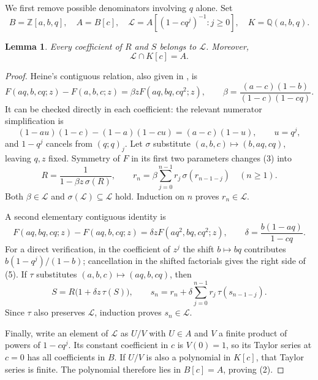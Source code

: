 \documentclass[10pt]{article}
\newtheorem{lemma}[theorem]{Lemma}
\newcommand{\Z}{\mathbb Z}
\newcommand{\Q}{\mathbb Q}
\begin{document}
We first remove possible denominators involving $q$ alone. Set
\[
 B=\Z[a,b,q],\quad A=B[c],\quad
 \mathcal L=A[(1-cq^j)^{-1}:j\ge0],\quad K=\Q(a,b,q).
\]
\begin{lemma}\label{integral}
Every coefficient of $R$ and $S$ belongs to $\mathcal L$.
Moreover,
\[
 \mathcal L\cap K[c]=A.                                  \tag{2}
\]
\end{lemma}
\begin{proof}
Heine's contiguous relation, also given in \cite[p.~13]{KS}, is
\[
 F(aq,b,cq;z)-F(a,b,c;z)
   =\beta z F(aq,bq,cq^2;z),\qquad
 \beta=\frac{(a-c)(1-b)}{(1-c)(1-cq)}.                    \tag{3}
\]
It can be checked directly in each coefficient: the relevant numerator
simplification is
\[
 (1-au)(1-c)-(1-a)(1-cu)=(a-c)(1-u),\qquad u=q^j,
\]
and $1-q^j$ cancels from $(q;q)_j$.
Let $\sigma$ substitute $(a,b,c)\mapsto(b,aq,cq)$, leaving $q,z$
fixed. Symmetry of $F$ in its first two parameters changes (3) into
\[
 R=\frac1{1-\beta z\,\sigma(R)},\qquad
 r_n=\beta\sum_{j=0}^{n-1}r_j\,\sigma(r_{n-1-j})\quad(n\ge1).
                                                               \tag{4}
\]
Both $\beta\in\mathcal L$ and
$\sigma(\mathcal L)\subseteq\mathcal L$ hold.
Induction on $n$ proves $r_n\in\mathcal L$.

A second elementary contiguous identity is
\[
 F(aq,bq,cq;z)-F(aq,b,cq;z)
   =\delta z F(aq^2,bq,cq^2;z),\qquad
 \delta=\frac{b(1-aq)}{1-cq}.                             \tag{5}
\]
For a direct verification, in the coefficient of $z^j$ the shift
$b\mapsto bq$ contributes $b(1-q^j)/(1-b)$; cancellation in the
shifted factorials gives the right side of (5).
If $\tau$ substitutes $(a,b,c)\mapsto(aq,b,cq)$, then
\[
 S=R\bigl(1+\delta z\,\tau(S)\bigr),\qquad
 s_n=r_n+\delta\sum_{j=0}^{n-1}r_j\,\tau(s_{n-1-j}).
                                                               \tag{6}
\]
Since $\tau$ also preserves $\mathcal L$, induction proves
$s_n\in\mathcal L$.

Finally, write an element of $\mathcal L$ as $U/V$ with $U\in A$
and $V$ a finite product of powers of $1-cq^j$. Its constant
coefficient in $c$ is $V(0)=1$, so its Taylor series at $c=0$ has
all coefficients in $B$. If $U/V$ is also a polynomial in $K[c]$,
that Taylor series is finite. The polynomial therefore lies in
$B[c]=A$, proving (2).
\end{proof}
\end{document}

